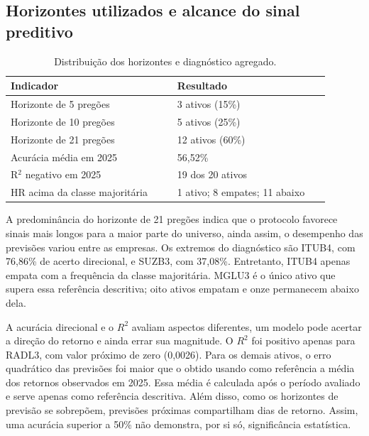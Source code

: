 \subsection*{Horizontes utilizados e alcance do sinal preditivo}
\begin{table}[H]
\centering
\caption{Distribuição dos horizontes e diagnóstico agregado.}
\label{tab:diagnostico_pool}
{\footnotesize
\begin{tabular}{@{}p{0.47\linewidth}p{0.43\linewidth}@{}}
\hline
Indicador & Resultado \\ \hline
Horizonte de 5 pregões & 3 ativos (15\%) \\
Horizonte de 10 pregões & 5 ativos (25\%) \\
Horizonte de 21 pregões & 12 ativos (60\%) \\
Acurácia média em 2025 & 56,52\% \\
R$^{2}$ negativo em 2025 & 19 dos 20 ativos \\
HR acima da classe majoritária & 1 ativo; 8 empates; 11 abaixo \\
\hline
\end{tabular}}
\par{}
\end{table}
A predominância do horizonte de 21 pregões indica que o protocolo favorece sinais mais longos para a maior parte do universo, ainda assim, o desempenho das previsões variou entre as empresas. Os extremos do diagnóstico são ITUB4, com 76,86\% de acerto direcional, e SUZB3, com 37,08\%. Entretanto, ITUB4 apenas empata com a frequência da classe majoritária. MGLU3 é o único ativo que supera essa referência descritiva; oito ativos empatam e onze permanecem abaixo dela.

A acurácia direcional e o $R^2$ avaliam aspectos diferentes, um modelo pode acertar a direção do retorno e ainda errar sua
magnitude. O $R^2$ foi positivo apenas para RADL3, com valor
próximo de zero (0,0026). Para os demais ativos, o erro
quadrático das previsões foi maior que o obtido usando como
referência a média dos retornos observados em 2025. Essa média
é calculada após o período avaliado e serve apenas como
referência descritiva. Além disso, como os horizontes de
previsão se sobrepõem, previsões próximas compartilham dias
de retorno. Assim, uma acurácia superior a 50\% não demonstra,
por si só, significância estatística.


